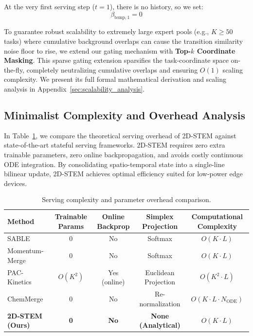 At the very first serving step ($t=1$), there is no history, so we set:
\begin{equation}
    \beta_{\text{temp}, 1} = 0
\end{equation}

To guarantee robust scalability to extremely large expert pools (e.g., $K \ge 50$ tasks) where cumulative background overlaps can cause the transition similarity noise floor to rise, we extend our gating mechanism with \textbf{Top-$k$ Coordinate Masking}. This sparse gating extension sparsifies the task-coordinate space on-the-fly, completely neutralizing cumulative overlaps and ensuring $O(1)$ scaling complexity. We present its full formal mathematical derivation and scaling analysis in Appendix~\ref{sec:scalability_analysis}.

\subsection{Minimalist Complexity and Overhead Analysis}
In Table~\ref{tab:overhead}, we compare the theoretical serving overhead of 2D-STEM against state-of-the-art stateful serving frameworks. 2D-STEM requires zero extra trainable parameters, zero online backpropagation, and avoids costly continuous ODE integration. By consolidating spatio-temporal state into a single-line bilinear update, 2D-STEM achieves optimal efficiency suited for low-power edge devices.

\begin{table}[h]
\caption{Serving complexity and parameter overhead comparison.}
\label{tab:overhead}
\vskip 0.15in
\begin{center}
\begin{small}
\begin{sc}
\begin{tabular}{lcccc}
\toprule
Method & Trainable Params & Online Backprop & Simplex Projection & Computational Complexity \\
\midrule
SABLE & 0 & No & Softmax & $O(K \cdot L)$ \\
Momentum-Merge & 0 & No & Softmax & $O(K \cdot L)$ \\
PAC-Kinetics & $O(K^2)$ & Yes (online) & Euclidean Projection & $O(K^2 \cdot L)$ \\
ChemMerge & 0 & No & Re-normalization & $O(K \cdot L \cdot N_{\text{ODE}})$ \\
\textbf{2D-STEM (Ours)} & \textbf{0} & \textbf{No} & \textbf{None (Analytical)} & \textbf{$O(K \cdot L)$} \\
\bottomrule
\end{tabular}
\end{sc}
\end{small}
\end{center}
\vskip -0.1in
\end{table}

